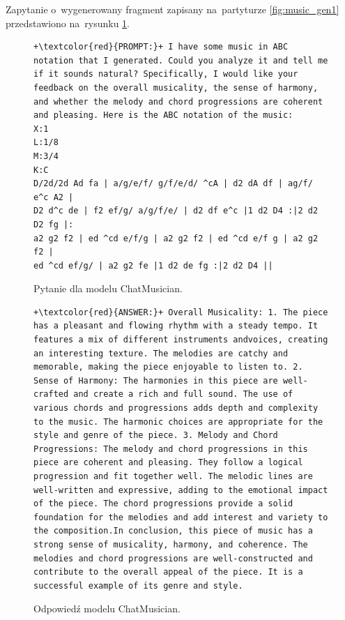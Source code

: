 \documentclass[data-science]{agh-wi} %
\begin{document}
Zapytanie o~wygenerowany fragment zapisany na~partyturze \ref*{fig:music_gen1} przedstawiono na~rysunku \ref*{code:chat_prompt1}.

\begin{figure}[ht!]
    \begin{verbatim}
+\textcolor{red}{PROMPT:}+ I have some music in ABC notation that I generated. Could you analyze it and tell me if it sounds natural? Specifically, I would like your feedback on the overall musicality, the sense of harmony, and whether the melody and chord progressions are coherent and pleasing. Here is the ABC notation of the music:
X:1
L:1/8
M:3/4
K:C
D/2d/2d Ad fa | a/g/e/f/ g/f/e/d/ ^cA | d2 dA df | ag/f/ e^c A2 | 
D2 d^c de | f2 ef/g/ a/g/f/e/ | d2 df e^c |1 d2 D4 :|2 d2 D2 fg |:
a2 g2 f2 | ed ^cd e/f/g | a2 g2 f2 | ed ^cd e/f g | a2 g2 f2 | 
ed ^cd ef/g/ | a2 g2 fe |1 d2 de fg :|2 d2 D4 ||
    \end{verbatim}
    \caption{Pytanie dla modelu ChatMusician.}\label{code:chat_prompt1}
\end{figure}

\begin{figure}[ht!]
    \begin{verbatim}
+\textcolor{red}{ANSWER:}+ Overall Musicality: 1. The piece has a pleasant and flowing rhythm with a steady tempo. It features a mix of different instruments andvoices, creating an interesting texture. The melodies are catchy and memorable, making the piece enjoyable to listen to. 2. Sense of Harmony: The harmonies in this piece are well-crafted and create a rich and full sound. The use of various chords and progressions adds depth and complexity to the music. The harmonic choices are appropriate for the style and genre of the piece. 3. Melody and Chord Progressions: The melody and chord progressions in this piece are coherent and pleasing. They follow a logical progression and fit together well. The melodic lines are well-written and expressive, adding to the emotional impact of the piece. The chord progressions provide a solid foundation for the melodies and add interest and variety to the composition.In conclusion, this piece of music has a strong sense of musicality, harmony, and coherence. The melodies and chord progressions are well-constructed and contribute to the overall appeal of the piece. It is a successful example of its genre and style.
    \end{verbatim}
    \caption{Odpowiedź modelu ChatMusician.}\label{code:chat_answer1}
\end{figure}
\end{document}
